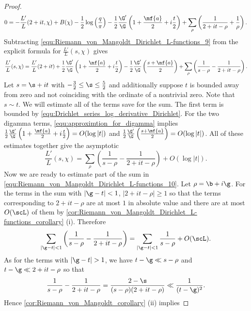 \begin{proof}
\begin{equation}
          0 = -\frac{L'}{L}(2+it,\chi)+B(\chi)-\frac{1}{2}\log\left(\frac{q}{\pi}\right)-\frac{1}{2}\frac{\G'}{\G}\left(1+\frac{\mf{a}}{2}+i\frac{t}{2}\right)+\sum_{\rho}\left(\frac{1}{2+it-\rho}+\frac{1}{\rho}\right).
        \end{equation}
        Subtracting \cref{equ:Riemann_von_Mangoldt_Dirichlet_L-functions_9} from the explicit formula for $\frac{L'}{L}(s,\chi)$ gives
        \[
          \frac{L'}{L}(s,\chi) = \frac{L'}{L}(2+it)+\frac{1}{2}\frac{\G'}{\G}\left(1+\frac{\mf{a}}{2}+i\frac{t}{2}\right)-\frac{1}{2}\frac{\G'}{\G}\left(\frac{s+\mf{a}}{2}\right)+\sum_{\rho}\left(\frac{1}{s-\rho}-\frac{1}{2+it-\rho}\right).
        \]
        Let $s = \s+it$ with $-\frac{3}{2} \le \s \le \frac{5}{2}$ and additionally suppose $t$ is bounded away from zero and not coinciding with the ordinate of a nontrivial zero. Note that $s \sim t$. We will estimate all of the terms save for the sum. The first term is bounded by \cref{equ:Drichlet_series_log_derivative_Dirichlet}. For the two digamma terms, \cref{equ:approximtion_for_digamma} implies $\frac{1}{2}\frac{\G'}{\G}\left(1+\frac{\mf{a}}{2}+i\frac{t}{2}\right) = O(\log|t|)$ and $\frac{1}{2}\frac{\G'}{\G}\left(\frac{s+\mf{a}}{2}\right) = O(\log|t|)$. All of these estimates together give the asymptotic
        \begin{equation}\label{equ:Riemann_von_Mangoldt_Dirichlet_L-functions_10}
          \frac{L'}{L}(s,\chi) = \sum_{\rho}\left(\frac{1}{s-\rho}-\frac{1}{2+it-\rho}\right)+O(\log|t|).
        \end{equation}
        Now we are ready to estimate part of the sum in \cref{equ:Riemann_von_Mangoldt_Dirichlet_L-functions_10}. Let $\rho = \b+i\g$. For the terms in the sum with $|\g-t| < 1$, $|2+it-\rho| \ge 1$ so that the terms corresponding to $2+it-\rho$ are at most $1$ in absolute value and there are at most $O(\scL)$ of them by \cref{cor:Riemann_von_Mangoldt_Dirichlet_L-functions_corollary} (i). Therefore
        \begin{equation}\label{equ:Riemann_von_Mangoldt_Dirichlet_L-functions_11}
          \sum_{|\g-t| < 1}\left(\frac{1}{s-\rho}-\frac{1}{2+it-\rho}\right) = \sum_{|\g-t| < 1}\frac{1}{s-\rho}+O(\scL).
        \end{equation}
        As for the terms with $|\g-t| > 1$, we have $t-\g \ll s-\rho$ and $t-\g \ll 2+it-\rho$ so that
        \[
          \frac{1}{s-\rho}-\frac{1}{2+it-\rho} = \frac{2-\s}{(s-\rho)(2+it-\rho)} \ll \frac{1}{(t-\g)^{2}}.
        \]
        Hence \cref{cor:Riemann_von_Mangoldt_corollary} (ii) implies

\end{proof}
